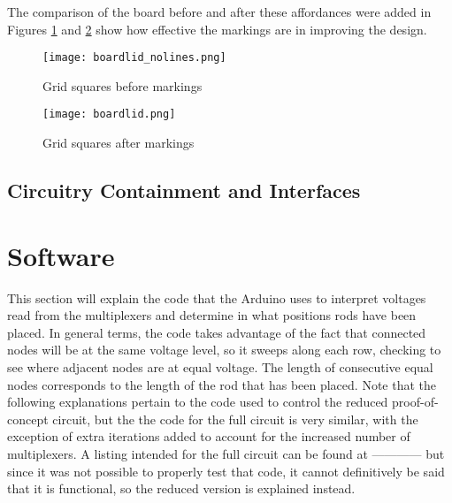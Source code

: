 The comparison of the board before and after these affordances were added in Figures \ref{fig:boardlid_nolines} and \ref{fig:boardlid}  show how effective the markings are in improving the design.

\begin{figure}[H]
	\begin{center}
	\texttt{[image: boardlid\_nolines.png]}\\ 
  	\caption{Grid squares before markings}
    \label{fig:boardlid_nolines}
    \end{center}
\end{figure}

\begin{figure}[H]
	\begin{center}
	\texttt{[image: boardlid.png]}\\ 
  	\caption{Grid squares after markings}
    \label{fig:boardlid}
    \end{center}
\end{figure}




\subsection{Circuitry Containment and Interfaces}

\section{Software}

This section will explain the code that the Arduino uses to interpret voltages read from the multiplexers and determine in what positions rods have been placed. In general terms, the code takes advantage of the fact that connected nodes will be at the same voltage level, so it sweeps along each row, checking to see where adjacent nodes are at equal voltage. The length of consecutive equal nodes corresponds to the length of the rod that has been placed. Note that the following explanations pertain to the code used to control the reduced proof-of-concept circuit, but the the code for the full circuit is very similar, with the exception of extra iterations added to account for the increased number of multiplexers. A listing intended for the full circuit can be found at ------------ but since it was not possible to properly test that code, it cannot definitively be said that it is functional, so the reduced version is explained instead.


